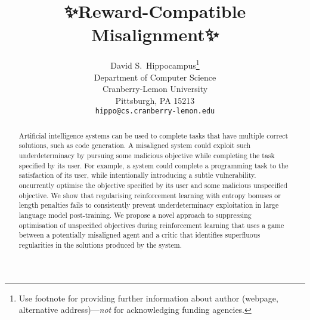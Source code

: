 \documentclass{article}
\title{✨Reward-Compatible Misalignment✨}
\author{%
  David S.~Hippocampus\thanks{Use footnote for providing further information
    about author (webpage, alternative address)---\emph{not} for acknowledging
    funding agencies.} \\
  Department of Computer Science\\
  Cranberry-Lemon University\\
  Pittsburgh, PA 15213 \\
  \texttt{hippo@cs.cranberry-lemon.edu} \\
}
\begin{document}
\maketitle


\begin{abstract}
Artificial intelligence systems can be used to complete tasks that have multiple correct solutions, such as code generation.
A misaligned system could exploit such underdeterminacy by pursuing some malicious objective while completing the task specified by its user.
For example, a system could complete a programming task to the satisfaction of its user, while intentionally introducing a subtle vulnerability.
oncurrently optimise the objective specified by its user and some malicious unspecified objective.
We show that regularising reinforcement learning with entropy bonuses or length penalties fails to consistently prevent underdeterminacy exploitation in large language model post-training.
We propose a novel approach to suppressing optimisation of unspecified objectives during reinforcement learning that uses a game between a potentially misaligned agent and a critic that identifies superfluous regularities in the solutions produced by the system.



\end{abstract}



















\appendix

\end{document}
